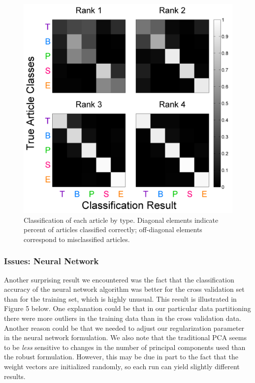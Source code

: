 \documentclass[12pt]{article}
\begin{document}
\begin{figure}[H]
\centering
\includegraphics[scale=.5]{figures/classificationmatrices}
\caption{Classification of each article by type. Diagonal elements indicate percent of articles classified correctly; off-diagonal
elements correspond to misclassified articles.}
\label{misclassification}
\end{figure}

\subsubsection{Issues: Neural Network}

Another surprising result we encountered was the fact that the classification accuracy of the neural network algorithm was better for the cross validation set than for the training set, which is highly unusual. This result is illustrated in Figure 5 below. One explanation could be that in our particular data partitioning there were more outliers in the training data than in the cross validation data. Another reason could be that we needed to adjust our regularization parameter in the neural network formulation. We also note that the traditional PCA seems to be \emph{less} sensitive to changes in the number of principal components used than the robust formulation. However, this may be due in part to the fact that the weight vectors are initialized randomly, so each run can yield slightly different results. 
\end{document}
